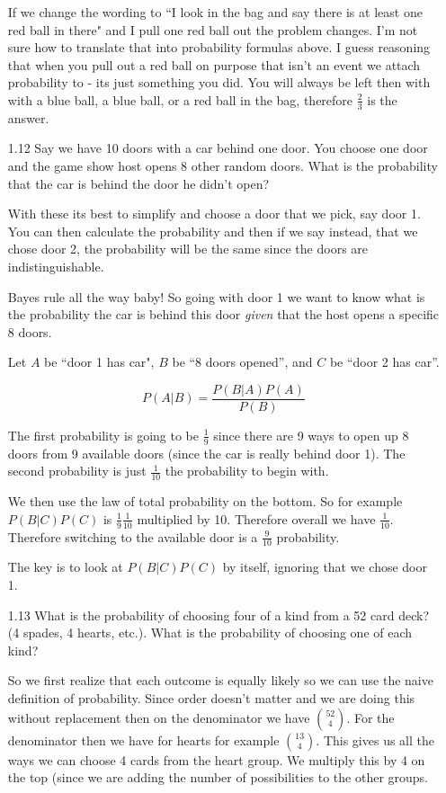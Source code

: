 \begin{enumerate}
If we change the wording to ``I look in the bag and say there is at least one red ball in there" and I pull one red ball out the problem changes. I'm not sure how to translate that into probability formulas above. I guess reasoning that when you pull out a red ball on purpose that isn't an event we attach probability to - its just something you did. You will always be left then with with a blue ball, a blue ball, or a red ball in the bag, therefore $\frac{2}{3}$ is the answer. 

\item[1.12]
Say we have 10 doors with a car behind one door. You choose one door and the game show host opens 8 other random doors. What is the probability that the car is behind the door he didn't open?

With these its best to simplify and choose a door that we pick, say door 1. You can then calculate the probability and then if we say instead, that we chose door 2, the probability will be the same since the doors are indistinguishable.

Bayes rule all the way baby! So going with door 1 we want to know what is the probability the car is behind this door \emph{given} that the host opens a specific 8 doors.

Let $A$ be ``door 1 has car", $B$ be ``8 doors opened'', and $C$ be ``door 2 has car''.

\begin{equation}
P(A | B) = \frac{P(B|A)P(A) }{P(B)}
\end{equation}

The first probability is going to be $\frac{1}{9}$ since there are 9 ways to open up 8 doors from 9 available doors (since the car is really behind door 1). The second probability is just $\frac{1}{10}$ the probability to begin with.

We then use the law of total probability on the bottom. So for example $P(B | C) P(C)$ is $\frac{1}{9}\frac{1}{10}$ multiplied by 10. Therefore overall we have $\frac{1}{10}$. Therefore switching to the available door is a $\frac{9}{10}$ probability. 

The key is to look at $P(B | C) P(C)$ by itself, ignoring that we chose door 1.

\item[1.13]
What is the probability of choosing four of a kind from a 52 card deck? (4 spades, 4 hearts, etc.). What is the probability of choosing one of each kind?

So we first realize that each outcome is equally likely so we can use the naive definition of probability. Since order doesn't matter and we are doing this without replacement then on the denominator we have $52 \choose 4$. For the denominator then we have for hearts for example $13 \choose 4$. This gives us all the ways we can choose 4 cards from the heart group. We multiply this by 4 on the top (since we are adding the number of possibilities to the other groups.


\end{enumerate}
